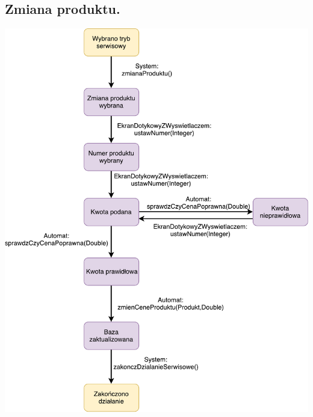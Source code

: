 \documentclass[11pt]{article}
\begin{document}
		\subsection{Zmiana produktu.}
		\begin{center}
			\includegraphics[scale=0.80]{stanu6.pdf}
		\end{center}
\end{document}
